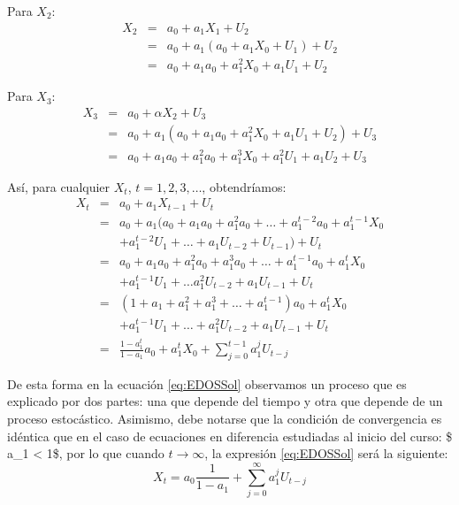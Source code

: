 \documentclass[
]{book}
\begin{document}
Para \(X_2\):
\begin{eqnarray*}
    X_{2} & = & a_0 + a_1 X_{1} + U_{2} \\
    & = & a_0 + a_1 (a_0 + a_1 X_{0} + U_{1}) + U_{2} \\
    & = & a_0 + a_1 a_0 + a_1^2 X_{0} + a_1 U_{1} + U_{2}
\end{eqnarray*}

Para \(X_3\):
\begin{eqnarray*}
    X_{3} & = & a_0 + \alpha X_{2} + U_{3} \\
    & = & a_0 + a_1 (a_0 + a_1 a_0 + a_1^2 X_{0} + a_1 U_{1} + U_{2}) + U_{3} \\
    & = & a_0 + a_1 a_0 + a_1^2 a_0 + a_1^3 X_{0} + a_1^2 U_{1} + a_1 U_{2} + U_{3}
\end{eqnarray*}

Así, para cualquier \(X_t\), \(t = 1, 2, 3, \ldots\), obtendríamos:
\begin{eqnarray}
    X_{t} & = & a_0 + a_1 X_{t - 1} + U_{t} \nonumber \\
    & = & a_0 + a_1 (a_0 + a_1 a_0 + a_1^2 a_0 + \ldots + a_1^{t-2} a_0 + a_1^{t-1} X_{0} \nonumber \\
    &   & + a_1^{t-2} U_{1} + \ldots + a_1 U_{t - 2} + U_{t - 1}) + U_{t} \nonumber \\
    & = & a_0 + a_1 a_0 + a_1^2 a_0 + a_1^3 a_0 + \ldots + a_1^{t-1} a_0 + a_1^{t} X_{0} \nonumber \\
    &   & + a_1^{t-1} U_{1} + \ldots a_1^2 U_{t - 2} + a_1 U_{t - 1} + U_{t} \nonumber \\
    & = & (1 + a_1 + a_1^2 + a_1^3 + \ldots + a_1^{t-1}) a_0 + a_1^{t} X_{0} \nonumber \\
    &   & + a_1^{t-1} U_{1} + \ldots + a_1^2 U_{t - 2} + a_1 U_{t - 1} + U_{t}  \nonumber\\
    & = & \frac{1 - a_1^t}{1 - a_1} a_0 + a_1^{t} X_{0} + \sum^{t-1}_{j = 0} a_1^{j} U_{t - j} 
    \label{eq:EDOSSol}
\end{eqnarray}

De esta forma en la ecuación \eqref{eq:EDOSSol} observamos un proceso que es explicado por dos partes: una que depende del tiempo y otra que depende de un proceso estocástico. Asimismo, debe notarse que la condición de convergencia es idéntica que en el caso de ecuaciones en diferencia estudiadas al inicio del curso: \$ \textbar a\_1\textbar{} \textless{} 1\$, por lo que cuando \(t \to \infty\), la expresión \eqref{eq:EDOSSol} será la siguiente:
\begin{equation}
    X_t = a_0 \frac{1}{1 - a_1} + \sum^{\infty}_{j = 0} a_1^{j} U_{t - j}
    \label{eq:EDOSLP}
\end{equation}
\end{document}

